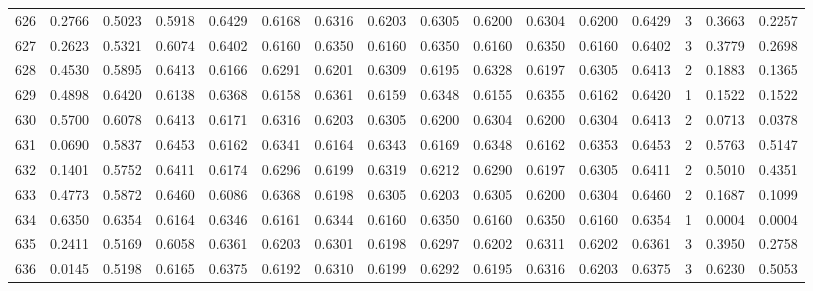 \begin{tabular}{lrrrrrrrrrrrrrrr}
626 &      0.2766 &  0.5023 &  0.5918 &  0.6429 &  0.6168 &  0.6316 &  0.6203 &  0.6305 &  0.6200 &  0.6304 &   0.6200 &     0.6429 &      3 &                    0.3663 &                     0.2257 \\
627 &      0.2623 &  0.5321 &  0.6074 &  0.6402 &  0.6160 &  0.6350 &  0.6160 &  0.6350 &  0.6160 &  0.6350 &   0.6160 &     0.6402 &      3 &                    0.3779 &                     0.2698 \\
628 &      0.4530 &  0.5895 &  0.6413 &  0.6166 &  0.6291 &  0.6201 &  0.6309 &  0.6195 &  0.6328 &  0.6197 &   0.6305 &     0.6413 &      2 &                    0.1883 &                     0.1365 \\
629 &      0.4898 &  0.6420 &  0.6138 &  0.6368 &  0.6158 &  0.6361 &  0.6159 &  0.6348 &  0.6155 &  0.6355 &   0.6162 &     0.6420 &      1 &                    0.1522 &                     0.1522 \\
630 &      0.5700 &  0.6078 &  0.6413 &  0.6171 &  0.6316 &  0.6203 &  0.6305 &  0.6200 &  0.6304 &  0.6200 &   0.6304 &     0.6413 &      2 &                    0.0713 &                     0.0378 \\
631 &      0.0690 &  0.5837 &  0.6453 &  0.6162 &  0.6341 &  0.6164 &  0.6343 &  0.6169 &  0.6348 &  0.6162 &   0.6353 &     0.6453 &      2 &                    0.5763 &                     0.5147 \\
632 &      0.1401 &  0.5752 &  0.6411 &  0.6174 &  0.6296 &  0.6199 &  0.6319 &  0.6212 &  0.6290 &  0.6197 &   0.6305 &     0.6411 &      2 &                    0.5010 &                     0.4351 \\
633 &      0.4773 &  0.5872 &  0.6460 &  0.6086 &  0.6368 &  0.6198 &  0.6305 &  0.6203 &  0.6305 &  0.6200 &   0.6304 &     0.6460 &      2 &                    0.1687 &                     0.1099 \\
634 &      0.6350 &  0.6354 &  0.6164 &  0.6346 &  0.6161 &  0.6344 &  0.6160 &  0.6350 &  0.6160 &  0.6350 &   0.6160 &     0.6354 &      1 &                    0.0004 &                     0.0004 \\
635 &      0.2411 &  0.5169 &  0.6058 &  0.6361 &  0.6203 &  0.6301 &  0.6198 &  0.6297 &  0.6202 &  0.6311 &   0.6202 &     0.6361 &      3 &                    0.3950 &                     0.2758 \\
636 &      0.0145 &  0.5198 &  0.6165 &  0.6375 &  0.6192 &  0.6310 &  0.6199 &  0.6292 &  0.6195 &  0.6316 &   0.6203 &     0.6375 &      3 &                    0.6230 &                     0.5053 \\

\end{tabular}
